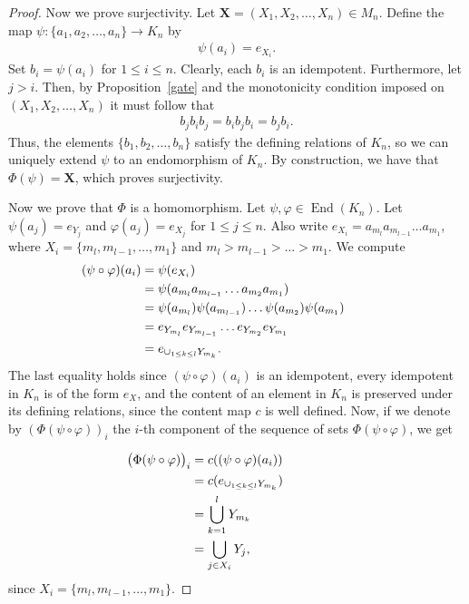\documentclass[pdflatex,sn-mathphys-num]{sn-jnl}%
\theoremstyle{thmstyleone}%
\theoremstyle{thmstyletwo}%
\theoremstyle{thmstylethree}%
\begin{document}
\begin{proof}
   Now we prove surjectivity. Let $\mathbf{X} = (X_1, X_2, \dots, X_n) \in M_n$. Define the map $\psi : \{a_1, a_2, \dots, a_n\} \rightarrow K_n$ by 
   \begin{align*}
      \psi(a_i) = e_{X_i}.
   \end{align*}
   Set $b_i = \psi(a_i)$ for $1 \leq i \leq n$. Clearly, each $b_i$ is an idempotent. Furthermore, let $j > i$. Then, by Proposition~\ref{gate} and the monotonicity condition imposed on $(X_1, X_2, \dots, X_n)$ it must follow that
   \begin{align*}
      b_j b_i b_j = b_i b_j b_i = b_j b_i.
   \end{align*}
   Thus, the elements $\{b_1, b_2, \dots, b_n\}$ satisfy the defining relations of $K_n$, so we can uniquely extend $\psi$ to an endomorphism of $K_n$. By construction, we have that $\Phi(\psi) = \mathbf{X}$, which proves surjectivity. 


   Now we prove that $\Phi$ is a homomorphism. Let $\psi, \varphi \in \operatorname{End}(K_n)$. Let
   $\psi(a_j) = e_{Y_j}$ and $\varphi(a_j) = e_{X_j}$ for $1 \leq j \leq n$. Also write $e_{X_i} = a_{m_l} a_{m_{l-1}} \dots a_{m_1}$, where $X_i = \{m_l, m_{l-1}, \dots, m_1\}$ and $m_l > m_{l-1} > \dots > m_1$. We compute
   \begin{align*}
      \hspace{-1.3cm} (\psi \circ \varphi)(a_i) &= \psi(e_{X_i}) \\
      &= \psi(a_{m_l} a_{m_{l-1}} \dots a_{m_2} a_{m_1})  \\
      &= \psi(a_{m_l}) \psi(a_{m_{l-1}}) \dots \psi(a_{m_2}) \psi(a_{m_1}) \\
      &= e_{Y_{m_l}} e_{Y_{m_{l-1}}} \dots e_{Y_{m_2}} e_{Y_{m_1}} \\
      &= e_{\cup_{1 \leq k \leq l} Y_{m_k}}.
   \end{align*}
   The last equality holds since $(\psi \circ \varphi)(a_i)$ is an idempotent, every idempotent in $K_n$ is of the form $e_X$, and the content of an element in $K_n$ is preserved under its defining relations, since the content map $c$ is well defined. Now, if we denote by
   $(\Phi(\psi \circ \varphi))_i$ the $i$-th component of the sequence of sets $\Phi(\psi \circ \varphi)$, we get
   
   \begin{align*}
      \hspace{-6cm} \big(\Phi(\psi \circ \varphi)\big)_i &= c((\psi \circ \varphi)(a_i)) \\
      &= c(e_{\cup_{1 \leq k \leq l} Y_{m_k}}) \\
      &= \bigcup\limits_{k =1}^{l} Y_{m_k} \\
      &= \bigcup\limits_{j \in X_i} Y_{j},
   \end{align*}
   since $X_i = \{m_l, m_{l-1}, \dots, m_1\}$.


\end{proof}
\end{document}
